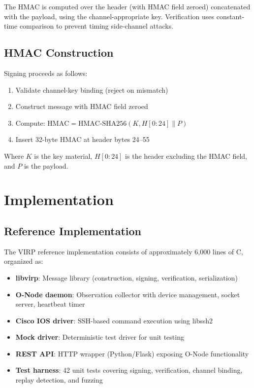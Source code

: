 \documentclass[11pt,twocolumn]{article}
\begin{document}
The HMAC is computed over the header (with HMAC field zeroed) concatenated with the payload, using the channel-appropriate key. Verification uses constant-time comparison to prevent timing side-channel attacks.

\subsection{HMAC Construction}

Signing proceeds as follows:

\begin{enumerate}[leftmargin=*]
    \item Validate channel-key binding (reject on mismatch)
    \item Construct message with HMAC field zeroed
    \item Compute: $\text{HMAC} = \text{HMAC-SHA256}(K, H[0{:}24] \| P)$
    \item Insert 32-byte HMAC at header bytes 24--55
\end{enumerate}

Where $K$ is the key material, $H[0{:}24]$ is the header excluding the HMAC field, and $P$ is the payload.

\section{Implementation}

\subsection{Reference Implementation}

The VIRP reference implementation consists of approximately 6,000 lines of C, organized as:

\begin{itemize}[leftmargin=*]
    \item \textbf{libvirp}: Message library (construction, signing, verification, serialization)
    \item \textbf{O-Node daemon}: Observation collector with device management, socket server, heartbeat timer
    \item \textbf{Cisco IOS driver}: SSH-based command execution using libssh2
    \item \textbf{Mock driver}: Deterministic test driver for unit testing
    \item \textbf{REST API}: HTTP wrapper (Python/Flask) exposing O-Node functionality
    \item \textbf{Test harness}: 42 unit tests covering signing, verification, channel binding, replay detection, and fuzzing
\end{itemize}
\end{document}
